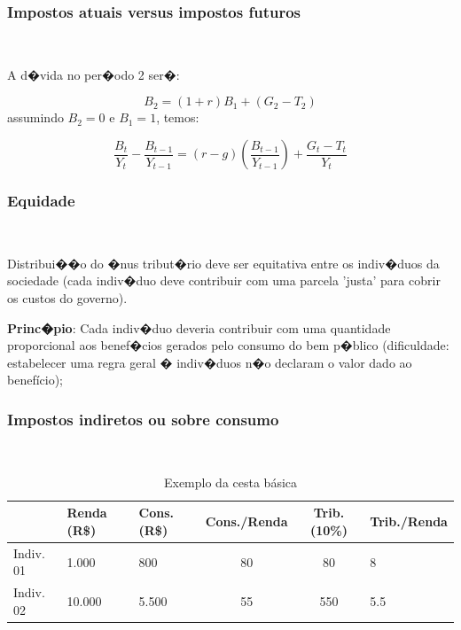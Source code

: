 \documentclass[11pt, hide notes]{beamer} %
\begin{document}
\begin{frame}[label=myslide06] %
	
	\frametitle{Impostos atuais versus impostos futuros} {\ %
		
A d�vida no per�odo 2 ser�:
		
\begin{equation}
B_2=(1+r)B_1+(G_2-T_2)
\label{obj4}
\end{equation}
assumindo $B_2=0$ e $B_1=1$, temos:

\begin{equation}
\frac{B_t}{Y_t}-\frac{B_{t-1}}{Y_{t-1}}=(r-g)\left(\frac{B_{t-1}}{Y_{t-1}}\right)+\frac{G_t-T_t}{Y_t}
\label{obj10}
\end{equation}		
				
	}  %
\end{frame}

\begin{frame}[label=myslide14] %
	
	\frametitle{Equidade} {\ %
		
		Distribui��o do �nus tribut�rio deve ser equitativa entre os indiv�duos da sociedade (cada indiv�duo deve contribuir com uma parcela 'justa' para cobrir os custos do governo). \\ \vspace{1cm}
		
		\textbf{Princ�pio}: Cada indiv�duo deveria contribuir
		com uma quantidade proporcional aos benef�cios gerados
		pelo consumo do bem p�blico (dificuldade: estabelecer uma
		regra geral � indiv�duos n�o declaram o valor dado ao
		benefício); 
		
	}
\end{frame}

\begin{frame}[label=myslide16.5] %
	
	\frametitle{Impostos indiretos ou sobre consumo} {\ %
		
		
		\begin{table}[H]
			\centering
			\caption{Exemplo da cesta básica}
			\vspace{-0.40cm}
			\begin{tabular}{@{}l|p{1cm}p{1cm}ccp{1.7cm}}
				\midrule
				& Renda (R\$) & Cons. (R\$) & Cons./Renda & Trib. (10\%) & Trib./Renda \\
				\midrule
				Indiv. 01 & 1.000 & 800   & 80    & 80    & 8 \\
				Indiv. 02 & 10.000 & 5.500 & 55    & 550   & 5.5 \\
				\bottomrule
			\end{tabular}%
			\label{tab1}%
		\end{table}%
		
	}
\end{frame}
\end{document}
